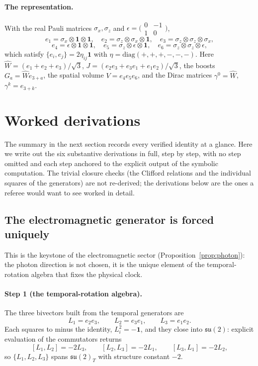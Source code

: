 \documentclass[11pt,oneside]{book}
\newcommand{\Wh}{\hat{W}}                         %
\newcommand{\su}{\mathfrak{su}}
\theoremstyle{plain}
\theoremstyle{definition}
\theoremstyle{remark}
\begin{document}
\paragraph{The representation.}
With the real Pauli matrices $\sigma_x,\sigma_z$ and
$\epsilon=\bigl(\begin{smallmatrix}0&-1\\1&0\end{smallmatrix}\bigr)$,
\[
  e_1=\sigma_x\!\otimes\!\mathbf 1\!\otimes\!\mathbf 1,\quad
  e_2=\sigma_z\!\otimes\!\sigma_x\!\otimes\!\mathbf 1,\quad
  e_3=\sigma_z\!\otimes\!\sigma_z\!\otimes\!\sigma_x,
\]
\[
  e_4=\epsilon\!\otimes\!\mathbf 1\!\otimes\!\mathbf 1,\quad
  e_5=\sigma_z\!\otimes\!\epsilon\!\otimes\!\mathbf 1,\quad
  e_6=\sigma_z\!\otimes\!\sigma_z\!\otimes\!\epsilon,
\]
which satisfy $\{e_i,e_j\}=2\eta_{ij}\mathbf 1$ with
$\eta=\mathrm{diag}(+,+,+,-,-,-)$. Here $\Wh=(e_1+e_2+e_3)/\sqrt3$,
$J=(e_2e_3+e_3e_1+e_1e_2)/\sqrt3$, the boosts $G_a=\Wh e_{3+a}$, the spatial volume
$V=e_4e_5e_6$, and the Dirac matrices $\gamma^0=\Wh$, $\gamma^k=e_{3+k}$.

\section{Worked derivations}
\label{sec:worked-derivations}

The summary in the next section records every verified identity at a glance. Here we
write out the six substantive derivations in full, step by step, with no step omitted
and each step anchored to the explicit output of the symbolic computation. The trivial
closure checks (the Clifford relations and the individual squares of the generators)
are not re-derived; the derivations below are the ones a referee would want to see
worked in detail.

\subsection{The electromagnetic generator is forced uniquely}
\label{wd:photon}
This is the keystone of the electromagnetic sector (Proposition~\ref{prop:photon}): the
photon direction is not chosen, it is the unique element of the temporal-rotation
algebra that fixes the physical clock.

\paragraph{Step 1 (the temporal-rotation algebra).}
The three bivectors built from the temporal generators are
\[
  L_1=e_2e_3,\qquad L_2=e_3e_1,\qquad L_3=e_1e_2 .
\]
Each squares to minus the identity, $L_i^2=-\mathbf 1$, and they close into
$\su(2)$: explicit evaluation of the commutators returns
\[
  [L_1,L_2]=-2L_3,\qquad [L_2,L_3]=-2L_1,\qquad [L_3,L_1]=-2L_2 ,
\]
so $\{L_1,L_2,L_3\}$ spans $\su(2)_T$ with structure constant $-2$.
\end{document}
